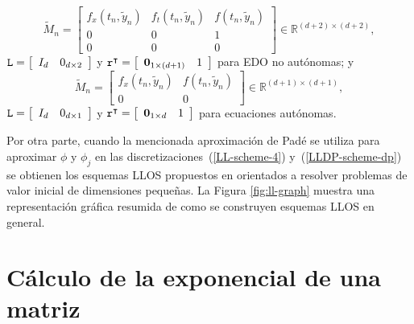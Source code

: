 \begin{equation*}
\widetilde{M}_{n}=\left[ 
\begin{array}{ccc}
f_{x}(t_{n},\widetilde{y}_{n}) &f%
_{t}(t_{n},\widetilde{y}_{n}) & f(t_{n},\widetilde{
		y}_{n}) \\ 
0 & 0 & 1 \\ 
0 & 0 & 0%
\end{array}%
\right] \in \mathbb{R}^{(d+2)\times (d+2)},
\end{equation*}%
$\lmatrix=\left[ 
\begin{array}{ll}
I_{d} & 0_{d\times 2}%
\end{array}%
\right] $ y $\rvector^{\intercal }=\left[ 
\begin{array}{ll}
\mathbf{0}_{1\times (d+1)} & 1%
\end{array}%
\right] $ para EDO no autónomas; y 
\begin{equation*}
\widetilde{M}_{n}=\left[ 
\begin{array}{cc}
f_{x}(t_{n},\widetilde{y}_{n}) & f(t_{n},%
\widetilde{y}_{n}) \\ 
0 & 0%
\end{array}%
\right] \in \mathbb{R}^{(d+1)\times (d+1)},
\end{equation*}%
$\lmatrix=\left[ 
\begin{array}{ll}
I_{d} & 0_{d\times 1}%
\end{array}%
\right] $ y $\rvector^{\intercal }=\left[ 
\begin{array}{ll}
\mathbf{0}_{1\times d} & 1%
\end{array}%
\right] $ para ecuaciones autónomas.

Por otra parte, cuando la mencionada aproximación de Padé se utiliza para aproximar $\phi$ y $\phi_j$ en las discretizaciones~(\ref{LL-scheme-4}) y~(\ref{LLDP-scheme-dp}) se obtienen los esquemas LLOS propuestos en \cite{Jimenez13,Jimenez14AMC} orientados a resolver problemas de valor inicial de dimensiones pequeñas. La Figura \ref{fig:ll-graph} muestra una representación gráfica resumida de como se construyen esquemas LLOS en general. 

\section{Cálculo de la exponencial de una matriz}

